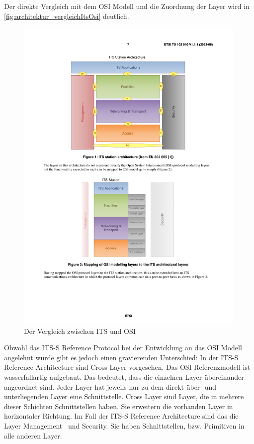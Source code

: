 Der direkte Vergleich mit dem \ac{OSI} Modell und die Zuordnung der Layer wird in \autoref{fig:architektur_vergleichItsOsi} deutlich.

\begin{figure}[h]
	\includegraphics[width=0.99\textwidth]{content/images/02_architektur/vergleichITS-OSI.pdf}
	\caption{Der Vergleich zwischen ITS und OSI \cite{ts102940}}
	\label{fig:architektur_vergleichItsOsi}
\end{figure}

Obwohl das \ac{ITS-S} Reference Protocol bei der Entwicklung an das \ac{OSI} Modell angelehnt wurde gibt es jedoch einen gravierenden Unterschied: In der \ac{ITS-S} Reference Architecture sind Cross Layer vorgesehen. Das \ac{OSI} Referenzmodell ist wasserfallartig aufgebaut. Das bedeutet, dass die einzelnen Layer übereinander angeordnet sind. Jeder Layer hat jeweils nur zu dem direkt über- und unterliegenden Layer eine Schnittstelle. Cross Layer sind Layer, die in mehrere dieser Schichten Schnittstellen haben. Sie erweitern die vorhanden Layer in horizontaler Richtung. Im Fall der \ac{ITS-S} Reference Architecture sind das die Layer \glqq Management\grqq~ und \glqq Security\grqq. Sie haben Schnittstellen, bzw. Primitiven in alle anderen Layer. 

